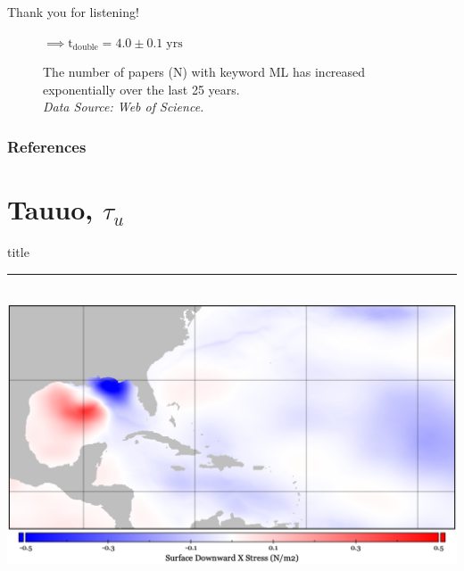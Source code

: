 \documentclass[usenames, dvipsnames]{beamer}
\begin{document}
\begin{frame}{Thank you for listening!}
\begin{minipage}{1.1\textwidth}
\begin{minipage}{0.50\textwidth}
\begin{figure}
            \normalsize{
    $\implies \mathrm{t}_{\mathrm{double}}=4.0\pm0.1\;\mathrm{yrs}$}
                \caption{The number of papers ($\mathrm{N}$) with keyword ML
                 has increased exponentially over the last 25 years.\\ \textit{
                   Data Source: Web of Science.} %
                   }
    \end{figure}
    \end{minipage}
\end{minipage}
\end{frame}


\begin{frame}[allowframebreaks]
\renewcommand*{\bibfont}{\footnotesize}
\footnotesize
        \frametitle{References}
        \printbibliography
\end{frame}

\appendix
\normalsize
\section{Tauuo, $\tau_u$ }
    \begin{frame}[plain]
        \vfill
      \centering
      \begin{beamercolorbox}[sep=8pt,center,shadow=true,rounded=true]{title}
        \insertsectionhead\par%
        \color{oxfordblue}\noindent\rule{10cm}{1pt} \\
                \includegraphics[width=0.93\linewidth]{images/tauuo.png}
      \end{beamercolorbox}
      \vfill
  \end{frame}
\end{document}
